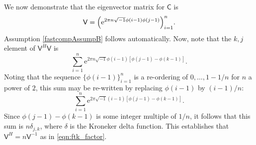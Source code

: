 \documentclass{iitthesis}          %
\newcommand{\mC}{\mathsf{C}}
\newcommand{\mV}{\mathsf{V}}
\newcommand{\me}{\mathrm{e}}
\begin{document}
We now demonstrate that the eigenvector matrix for $\mC$ is 
\begin{equation} \label{latticeVdef}
\mV = \Bigl ( \me^{2 \pi n \sqrt{-1} \phi(i-1)\phi(j-1)} \Bigr)_{i = 1}^n.
\end{equation}
Assumption \eqref{fastcompAssumpB} follows automatically.
Now, note that the $k,j$ element of $\mV^H\mV$ is
\begin{equation*}
\sum_{i=1}^n \me^{2 \pi n \sqrt{-1} \phi(i-1)[\phi(j-1) - \phi(k-1)]}.
\end{equation*}
Noting that the sequence $\{\phi(i-1)\}_{i=1}^n$ is a re-ordering of $0, \ldots, 1-1/n$ for $n$ a power of $2$, this sum may be re-written by replacing $\phi(i-1)$ by $(i-1)/n$:
\begin{equation*}
\sum_{i=1}^n \me^{2 \pi \sqrt{-1} (i-1)[\phi(j-1) - \phi(k-1)]}.
\end{equation*}
Since $\phi(j-1) - \phi(k-1)$ is some integer multiple of $1/n$, it follows that this sum is $n \delta_{j,k}$, where $\delta$ is the Kroneker delta function.  This establishes that $\mV^H = n \mV^{-1}$ as in \eqref{eqn:ftk_factor}.
\end{document}
